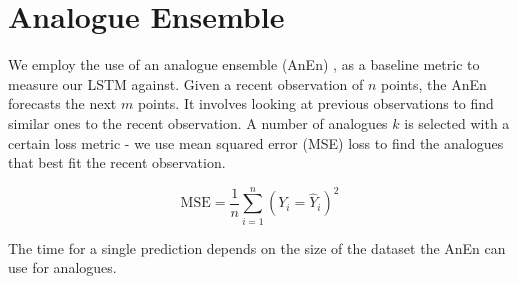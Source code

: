 \section{Analogue Ensemble}
\label{sec:an_en}

We employ the use of an analogue ensemble (AnEn) \cite{owens_an_en},
\cite{haines_an_en} as a baseline metric to measure our LSTM against. Given
a recent observation of $n$ points, the AnEn forecasts the next $m$ points.
It involves looking at previous observations to find similar ones to the
recent observation. A number of analogues $k$ is selected with a certain
loss metric - we use mean squared error (MSE) loss to find the analogues
that best fit the recent observation.

\begin{equation}
  \mathrm{MSE} = \frac{1}{n} \sum_{i=1}^{n} (Y_i = \hat{Y}_i)^2
\end{equation}

The time for a single prediction depends on the size of the dataset the
AnEn can use for analogues.